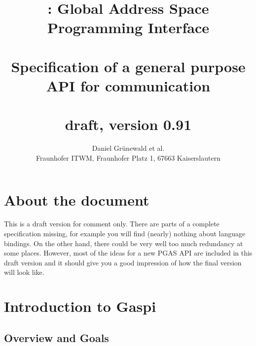 \documentclass[a4paper]{article}
\title{\GASPI{}: Global Address Space Programming Interface\\
~\\
Specification of a general purpose API for communication\\
~\\
draft, version 0.91
}
\author{Daniel Gr\"unewald et al.\\
Fraunhofer ITWM, Fraunhofer Platz 1, 67663 Kaiserslautern
}
\makeatletter
\newlength{\st}\setlength{\st}{0pt}
\newcommand{\GASPI}{{\sc Gaspi}}
\newcounter{counttodo}
\newlength{\savetabcolsep}
\newlength{\savearrayrulewidth}
\newenvironment{todo}
{\stepcounter{counttodo}
 \typeout{Environment TODO call \thecounttodo}
 \setlength{\savetabcolsep}{\tabcolsep}
 \setlength{\savearrayrulewidth}{\arrayrulewidth}
 \renewcommand{\tabcolsep}{0pt}
 \renewcommand{\arrayrulewidth}{2pt}
 \begin{center}
 \begin{tabular}{c|l@{\hspace*{2em}}|@{\hspace*{2em}}c}
 &
 \begin{minipage}{0.66\textwidth}
 \begin{itemize}
}
{\end{itemize}
 \end{minipage}
 &  todo \#\thecounttodo
 \end{tabular} \marginpar{$\Longleftarrow$}
 \end{center}
 \renewcommand{\tabcolsep}{\savetabcolsep}
 \renewcommand{\arrayrulewidth}{\savearrayrulewidth}
}
\makeatother
\begin{document}
\begin{titlepage}
\maketitle
\end{titlepage}

\tableofcontents


\newpage


\section{About the document}

This is a draft version for comment only. There are parts of a
complete specification missing, for example you will find (nearly)
nothing about language bindings. On the other hand, there could be
very well too much redundancy at some places. However, most of the
ideas for a new PGAS API are included in this draft version and it
should give you a good impression of how the final version will look
like.

\section{Introduction to \GASPI{}}
\label{sec::Intro}

\subsection{Overview and Goals}
\label{subsec::Overview}
\end{document}
